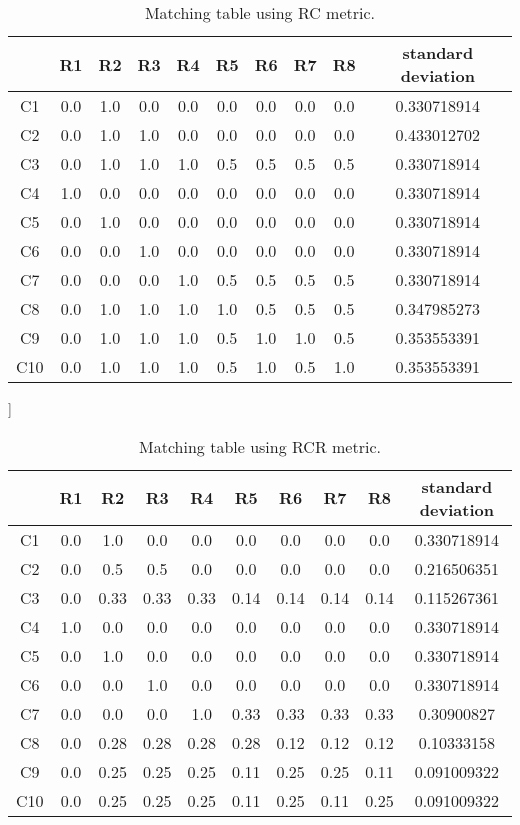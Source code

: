 \begin{table}[!h]
\centering
\caption{Matching table using RC metric.}
\begin{tabular}{c|c|c|c|c|c|c|c|c|c|} \cline{2-10}
&R1&R2&R3&R4&R5&R6&R7&R8&standard deviation\\ \hline
\multicolumn{1}{|c|}{C1}&0.0&1.0&0.0&0.0&0.0&0.0&0.0&0.0&0.330718914\\ \hline
\multicolumn{1}{|c|}{C2}&0.0&1.0&1.0&0.0&0.0&0.0&0.0&0.0&0.433012702\\ \hline
\multicolumn{1}{|c|}{C3}&0.0&1.0&1.0&1.0&0.5&0.5&0.5&0.5&0.330718914\\ \hline
\multicolumn{1}{|c|}{C4}&1.0&0.0&0.0&0.0&0.0&0.0&0.0&0.0&0.330718914\\ \hline
\multicolumn{1}{|c|}{C5}&0.0&1.0&0.0&0.0&0.0&0.0&0.0&0.0&0.330718914\\ \hline
\multicolumn{1}{|c|}{C6}&0.0&0.0&1.0&0.0&0.0&0.0&0.0&0.0&0.330718914\\ \hline
\multicolumn{1}{|c|}{C7}&0.0&0.0&0.0&1.0&0.5&0.5&0.5&0.5&0.330718914\\ \hline
\multicolumn{1}{|c|}{C8}&0.0&1.0&1.0&1.0&1.0&0.5&0.5&0.5&0.347985273\\ \hline
\multicolumn{1}{|c|}{C9}&0.0&1.0&1.0&1.0&0.5&1.0&1.0&0.5&0.353553391\\ \hline
\multicolumn{1}{|c|}{C10}&0.0&1.0&1.0&1.0&0.5&1.0&0.5&1.0&0.353553391\\ \hline
\end{tabular}
\label{tab:TableUML2ER4R}
\end{table}

\begin{table}[[!h]]
\centering
\caption{Matching table using RCR metric.}
\begin{tabular}{c|c|c|c|c|c|c|c|c|c|} \cline{2-10}
&R1&R2&R3&R4&R5&R6&R7&R8&standard deviation\\ \hline
\multicolumn{1}{|c|}{C1}&0.0&1.0&0.0&0.0&0.0&0.0&0.0&0.0&0.330718914\\ \hline
\multicolumn{1}{|c|}{C2}&0.0&0.5&0.5&0.0&0.0&0.0&0.0&0.0&0.216506351\\ \hline
\multicolumn{1}{|c|}{C3}&0.0&0.33&0.33&0.33&0.14&0.14&0.14&0.14&0.115267361\\ \hline
\multicolumn{1}{|c|}{C4}&1.0&0.0&0.0&0.0&0.0&0.0&0.0&0.0&0.330718914\\ \hline
\multicolumn{1}{|c|}{C5}&0.0&1.0&0.0&0.0&0.0&0.0&0.0&0.0&0.330718914\\ \hline
\multicolumn{1}{|c|}{C6}&0.0&0.0&1.0&0.0&0.0&0.0&0.0&0.0&0.330718914\\ \hline
\multicolumn{1}{|c|}{C7}&0.0&0.0&0.0&1.0&0.33&0.33&0.33&0.33&0.30900827\\ \hline
\multicolumn{1}{|c|}{C8}&0.0&0.28&0.28&0.28&0.28&0.12&0.12&0.12&0.10333158\\ \hline
\multicolumn{1}{|c|}{C9}&0.0&0.25&0.25&0.25&0.11&0.25&0.25&0.11&0.091009322\\ \hline
\multicolumn{1}{|c|}{C10}&0.0&0.25&0.25&0.25&0.11&0.25&0.11&0.25&0.091009322\\ \hline
\end{tabular}
\label{tab:TableUML2ER4CR}
\end{table}

